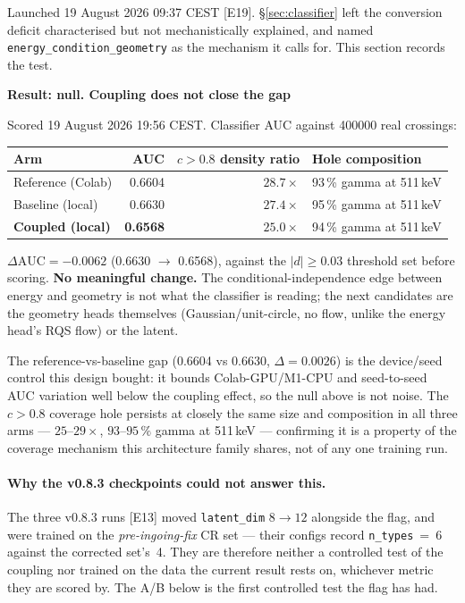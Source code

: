 \documentclass[11pt,a4paper]{article}
\newcommand{\ev}[1]{{\footnotesize\textcolor{prov}{[#1]}}}
\newenvironment{callout}[3]%
{\par\medskip\noindent
 \def\calloutframe{#1}\def\calloutback{#2}%
 \setlength{\fboxrule}{0.9pt}\setlength{\fboxsep}{8pt}%
 \begin{lrbox}{\calloutbox}%
 \begin{minipage}{\dimexpr\textwidth-2\fboxsep-2\fboxrule\relax}%
 \setlength{\parskip}{4pt}%
 \textcolor{#1}{\textbf{#3}}\par\nobreak\smallskip}
{\end{minipage}\end{lrbox}%
 \fcolorbox{\calloutframe}{\calloutback}{\usebox{\calloutbox}}%
 \par\medskip}
\begin{document}
Launched 19 August 2026 09:37 CEST \ev{E19}. \S\ref{sec:classifier} left the
conversion deficit characterised but not mechanistically explained, and named
\texttt{energy\_condition\_geometry} as the mechanism it calls for. This section
records the test.

\begin{callout}{warn}{red!4}{Result: null. Coupling does not close the gap}
Scored 19 August 2026 19:56 CEST. Classifier AUC against \num{400000} real
crossings:
\begin{center}
\begin{tabular}{lrrl}
\toprule
Arm & AUC & $c{>}0.8$ density ratio & Hole composition \\
\midrule
Reference (Colab)     & 0.6604 & $28.7\times$ & 93\,\% gamma at 511\,keV \\
Baseline (local)      & 0.6630 & $27.4\times$ & 95\,\% gamma at 511\,keV \\
\textbf{Coupled (local)} & \textbf{0.6568} & $25.0\times$ & 94\,\% gamma at 511\,keV \\
\bottomrule
\end{tabular}
\end{center}
$\Delta\mathrm{AUC} = -0.0062$ (0.6630 $\to$ 0.6568), against the $\lvert d\rvert
\geq 0.03$ threshold set before scoring. \textbf{No meaningful change.} The
conditional-independence edge between energy and geometry is not what the
classifier is reading; the next candidates are the geometry heads themselves
(Gaussian/unit-circle, no flow, unlike the energy head's RQS flow) or the
latent.
\end{callout}

The reference-vs-baseline gap (0.6604 vs 0.6630, $\Delta=0.0026$) is the
device/seed control this design bought: it bounds Colab-GPU/M1-CPU and
seed-to-seed AUC variation well below the coupling effect, so the null above is
not noise. The $c{>}0.8$ coverage hole persists at closely the same size and
composition in all three arms --- $25$--$29\times$, $93$--$95\,\%$ gamma at
511\,keV --- confirming it is a property of the coverage mechanism this
architecture family shares, not of any one training run.

\paragraph{Why the v0.8.3 checkpoints could not answer this.}
The three v0.8.3 runs \ev{E13} moved \texttt{latent\_dim} $8\to12$ alongside the
flag, and were trained on the \emph{pre-ingoing-fix} CR set --- their configs
record \texttt{n\_types}~=~6 against the corrected set's~4. They are therefore
neither a controlled test of the coupling nor trained on the data the current
result rests on, whichever metric they are scored by. The A/B below is the first
controlled test the flag has had.
\end{document}
